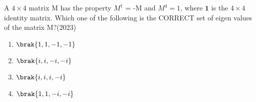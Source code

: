     \item A $4\times4$ matrix M has the property $M^\dagger$ = -M and $M^4=1$,  where $\mathbf{1}$ is the $4\times4$ identity matrix. Which one of the following is the CORRECT set of eigen values of the matrix M?\hfill (2023)
    \begin{enumerate}[label=(\Alph*)]
        \item $\brak{1,1,-1,-1}$
        \item $\brak{i,i,-i,-i}$
        \item $\brak{i,i,i,-i}$
        \item $\brak{1,1,-i,-i}$
    \end{enumerate}

